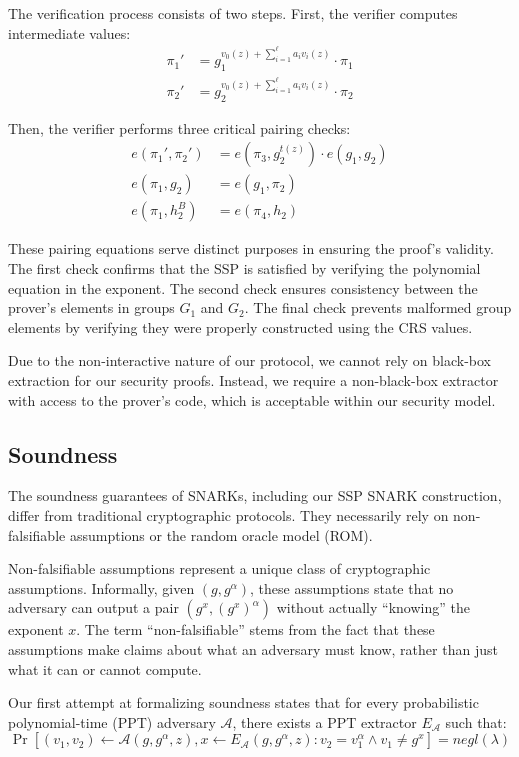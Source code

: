 The verification process consists of two steps. First, the verifier computes intermediate values:
\begin{align*}
    \pi_1' &= g_1^{v_0(z) + \sum_{i=1}^\ell a_i v_i(z)} \cdot \pi_1 \\
    \pi_2' &= g_2^{v_0(z) + \sum_{i=1}^\ell a_i v_i(z)} \cdot \pi_2
\end{align*}

Then, the verifier performs three critical pairing checks:
\begin{align*}
    e(\pi_1', \pi_2') &= e(\pi_3, g_2^{t(z)}) \cdot e(g_1, g_2) \\
    e(\pi_1, g_2) &= e(g_1, \pi_2) \\
    e(\pi_1, h_2^B) &= e(\pi_4, h_2)
\end{align*}

These pairing equations serve distinct purposes in ensuring the proof's validity. The first check confirms that the SSP is satisfied by verifying the polynomial equation in the exponent. The second check ensures consistency between the prover's elements in groups $G_1$ and $G_2$. The final check prevents malformed group elements by verifying they were properly constructed using the CRS values.

Due to the non-interactive nature of our protocol, we cannot rely on black-box extraction for our security proofs. Instead, we require a non-black-box extractor with access to the prover's code, which is acceptable within our security model.

\subsection{Soundness}

The soundness guarantees of SNARKs, including our SSP SNARK construction, differ from traditional cryptographic protocols. They necessarily rely on non-falsifiable assumptions or the random oracle model (ROM).

Non-falsifiable assumptions represent a unique class of cryptographic assumptions. Informally, given $(g, g^\alpha)$, these assumptions state that no adversary can output a pair $(g^x, (g^x)^\alpha)$ without actually ``knowing'' the exponent $x$. The term ``non-falsifiable'' stems from the fact that these assumptions make claims about what an adversary must know, rather than just what it can or cannot compute.

Our first attempt at formalizing soundness states that for every probabilistic polynomial-time (PPT) adversary $\mathcal{A}$, there exists a PPT extractor $E_\mathcal{A}$ such that:
\[ \Pr[(v_1, v_2) \gets \mathcal{A}(g, g^\alpha, z), x \gets E_\mathcal{A}(g, g^\alpha, z) : v_2 = v_1^\alpha \land v_1 \neq g^x] = negl(\lambda) \]

